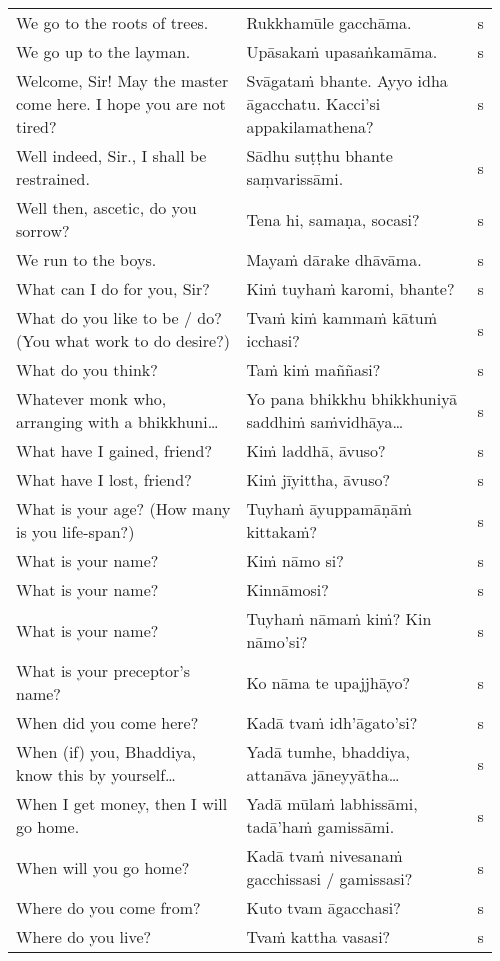 \documentclass[a5paper]{memoir}
\begin{document}
\begin{longtable}{L{0.48\linewidth} L{0.48\linewidth} H}
We go to the roots of trees. & Rukkhamūle gacchāma. & s\\[0pt]
We go up to the layman. & Upāsakaṁ upasaṅkamāma. & s\\[0pt]
Welcome, Sir! May the master come here. I hope you are not tired? & Svāgataṁ bhante. Ayyo idha āgacchatu. Kacci'si appakilamathena? & s\\[0pt]
Well indeed, Sir., I shall be restrained. & Sādhu suṭṭhu bhante saṃvarissāmi. & s\\[0pt]
Well then, ascetic, do you sorrow? & Tena hi, samaṇa, socasi? & s\\[0pt]
We run to the boys. & Mayaṁ dārake dhāvāma. & s\\[0pt]
What can I do for you, Sir? & Kiṁ tuyhaṁ karomi, bhante? & s\\[0pt]
What do you like to be / do? (You what work to do desire?) & Tvaṁ kiṁ kammaṁ kātuṁ icchasi? & s\\[0pt]
What do you think? & Taṁ kiṁ maññasi? & s\\[0pt]
Whatever monk who, arranging with a bhikkhuni\ldots{} & Yo pana bhikkhu bhikkhuniyā saddhiṁ saṁvidhāya\ldots{} & s\\[0pt]
What have I gained, friend? & Kiṁ laddhā, āvuso? & s\\[0pt]
What have I lost, friend? & Kiṁ jīyittha, āvuso? & s\\[0pt]
What is your age? (How many is you life-span?) & Tuyhaṁ āyuppamāṇāṁ kittakaṁ? & s\\[0pt]
What is your name? & Kiṁ nāmo si? & s\\[0pt]
What is your name? & Kinnāmosi? & s\\[0pt]
What is your name? & Tuyhaṁ nāmaṁ kiṁ? Kin nāmo'si? & s\\[0pt]
What is your preceptor's name? & Ko nāma te upajjhāyo? & s\\[0pt]
When did you come here? & Kadā tvaṁ idh'āgato'si? & s\\[0pt]
When (if) you, Bhaddiya, know this by yourself\ldots{} & Yadā tumhe, bhaddiya, attanāva jāneyyātha\ldots{} & s\\[0pt]
When I get money, then I will go home. & Yadā mūlaṁ labhissāmi, tadā'haṁ gamissāmi. & s\\[0pt]
When will you go home? & Kadā tvaṁ nivesanaṁ gacchissasi / gamissasi? & s\\[0pt]
Where do you come from? & Kuto tvam āgacchasi? & s\\[0pt]
Where do you live? & Tvaṁ kattha vasasi? & s\\[0pt]

\end{longtable}
\end{document}
